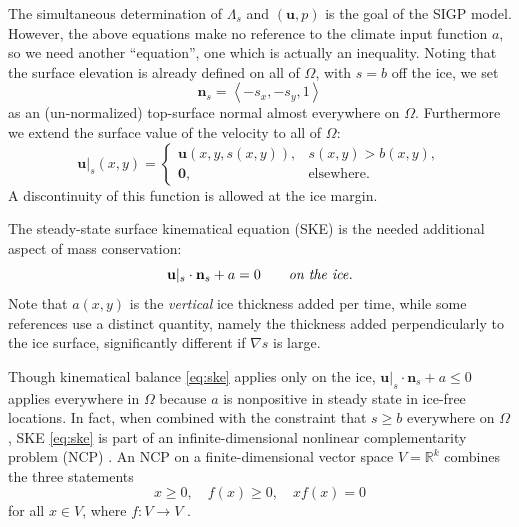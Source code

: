 \documentclass[letterpaper,final,12pt,reqno]{amsart}
\theoremstyle{claim}
\newcommand{\RR}{\mathbb{R}}
\newcommand{\grad}{\nabla}
\newcommand{\bn}{\mathbf{n}}
\newcommand{\bu}{\mathbf{u}}
\newcommand{\bzero}{\bm{0}}
\newcommand{\bus}{\bu|_s}
\numberwithin{equation}{section}
\numberwithin{figure}{section}
\numberwithin{table}{section}
\numberwithin{theorem}{section}
\begin{document}
The simultaneous determination of $\Lambda_s$ and $(\bu,p)$ is the goal of the SIGP model.  However, the above equations make no reference to the climate input function $a$, so we need another ``equation'', one which is actually an inequality.  Noting that the surface elevation is already defined on all of $\Omega$, with $s=b$ off the ice, we set
\begin{equation}
\bn_s = \left<-s_x,-s_y,1\right> \label{eq:surfacenormal}
\end{equation}
as an (un-normalized) top-surface normal almost everywhere on $\Omega$.  Furthermore we extend the surface value of the velocity to all of $\Omega$:
\begin{equation}
\bus(x,y) = \begin{cases} \bu(x,y,s(x,y)), & s(x,y) > b(x,y), \\
                     \bzero, & \text{elsewhere}. \end{cases} \label{eq:surfacevelocity}
\end{equation}
A discontinuity of this function is allowed at the ice margin.

The steady-state surface kinematical equation (SKE) \cite[equation (5.21)]{GreveBlatter2009} is the needed additional aspect of mass conservation:
\begin{equation}
\bus \cdot \bn_s + a = 0 \qquad \text{\emph{on the ice}}. \label{eq:ske}
\end{equation}
Note that $a(x,y)$ is the \emph{vertical} ice thickness added per time, while some references use a distinct quantity, namely the thickness added perpendicularly to the ice surface, significantly different if $\grad s$ is large.

Though kinematical balance \eqref{eq:ske} applies only on the ice, $\bus \cdot \bn_s + a \le 0$ applies everywhere in $\Omega$ because $a$ is nonpositive in steady state in ice-free locations.  In fact, when combined with the constraint that $s\ge b$ everywhere on $\Omega$, SKE \eqref{eq:ske} is part of an infinite-dimensional nonlinear complementarity problem (NCP) \cite{Bueler2021conservation}.  An NCP on a finite-dimensional vector space $V=\RR^k$ combines the three statements
\begin{equation}
x\ge 0, \quad f(x)\ge 0, \quad x f(x)=0 \label{eq:ncp}
\end{equation}
for all $x\in V$, where $f:V\to V$ \cite{FacchineiPang2003}.
\end{document}
